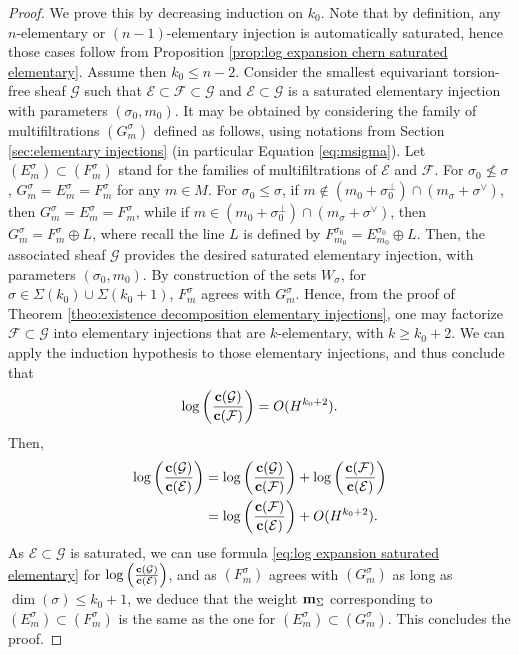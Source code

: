 \documentclass[a4paper,10pt]{amsart}
\theoremstyle{plain}{
    \newtheorem{theorem}{Theorem}[section]
    \newtheorem{lemma}[theorem]{Lemma}
    \newtheorem{corollary}[theorem]{Corollary}
    \newtheorem{proposition}[theorem]{Proposition}
    \newtheorem{conjecture}[theorem]{Conjecture}
}
\theoremstyle{definition}{
    \newtheorem{definition}[theorem]{Definition}
    \newtheorem{defn-thm}[theorem]{Definition-Theorem}
    \newtheorem{example}[theorem]{Example}
    \newtheorem{notation}[theorem]{Notation}
}
\theoremstyle{remark}{
    \newtheorem{remark}[theorem]{Remark}
    \newtheorem{problem}[theorem]{Problem}
    \newtheorem{question}[theorem]{Question}
}
\def\um{{\bf m}}
\def\uc{{\bf c}}
\def\cF{\mathcal{F}}
\def\cE{\mathcal{E}}
\def\cG{\mathcal{G}}
\begin{document}
\begin{proof}
We prove this by decreasing induction on $k_0$. Note that by definition, any $n$-elementary or $(n-1)$-elementary injection is automatically saturated, hence those cases follow from Proposition \ref{prop:log expansion chern saturated elementary}. Assume then $k_0\leq n-2$. Consider the smallest equivariant torsion-free sheaf $\cG$ such that $\cE\subset\cF\subset \cG$ and $\cE\subset \cG$ is a saturated elementary injection with parameters $(\sigma_0,m_0)$. It may be obtained by considering the family of multifiltrations $(G^\sigma_m)$ defined as follows, using notations from Section \ref{sec:elementary injections} (in particular Equation \eqref{eq:msigma}). Let $(E^\sigma_m)\subset (F^\sigma_m)$ stand for the families of multifiltrations of $\cE$ and $\cF$. For $\sigma_0\nleq \sigma$, $G^\sigma_m=E^\sigma_m=F^\sigma_m$ for any $m\in M$. For $\sigma_0\leq \sigma$, if $m\notin (m_0+\sigma_0^\perp)\cap(m_\sigma+\sigma^\vee)$, then $G^\sigma_m=E^\sigma_m=F^\sigma_m$, while if $m\in (m_0+\sigma_0^\perp)\cap(m_\sigma+\sigma^\vee)$, then $G^\sigma_m=F^\sigma_m\oplus L$, where recall the line $L$ is defined by $F^{\sigma_0}_{m_0}=E^{\sigma_0}_{m_0}\oplus L$. Then, the associated sheaf $\cG$ provides the desired saturated elementary injection, with parameters $(\sigma_0,m_0)$. By construction of the sets $W_\sigma$, for $\sigma\in\Sigma(k_0)\cup\Sigma(k_0+1)$, $F^\sigma_m$ agrees with $G^\sigma_m$. Hence, from the proof of Theorem \ref{theo:existence decomposition elementary injections}, one may factorize $\cF\subset \cG$ into elementary injections that are $k$-elementary, with $k\geq k_0+2$. We can apply the induction hypothesis to those elementary injections, and thus conclude that
$$
\log\left(\frac{\uc(\cG)}{\uc(\cF)}\right)=O(H^{k_0+2}).
$$
 Then, 
 \begin{eqnarray*}
 \log\left(\frac{\uc(\cG)}{\uc(\cE)}\right) &=\displaystyle\log\left(\frac{\uc(\cG)}{\uc(\cF)}\right)+\log\left(\frac{\uc(\cF)}{\uc(\cE)}\right)\\
  & = \displaystyle\log\left(\frac{\uc(\cF)}{\uc(\cE)}\right)+O(H^{k_0+2}).
 \end{eqnarray*}
 As $\cE\subset\cG$ is saturated, we can use formula \eqref{eq:log expansion saturated elementary} for $\log\left(\frac{\uc(\cG)}{\uc(\cE)}\right)$, and as $(F^\sigma_m)$ agrees with $(G^\sigma_m)$ as long as $\dim(\sigma)\leq k_0+1$, we deduce that the weight $\um_\Sigma$ corresponding to $(E^\sigma_m)\subset (F^\sigma_m)$ is the same as the one for $(E^\sigma_m)\subset(G^\sigma_m)$. This concludes the proof.
\end{proof}
\end{document}

